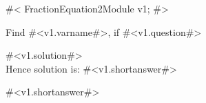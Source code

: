 

#<
FractionEquation2Module v1;
#>

Find #<v1.varname#>, if #<v1.question#>

#<v1.solution#>\\ [1.8mm]
Hence solution is: #<v1.shortanswer#> 

#<v1.shortanswer#>


